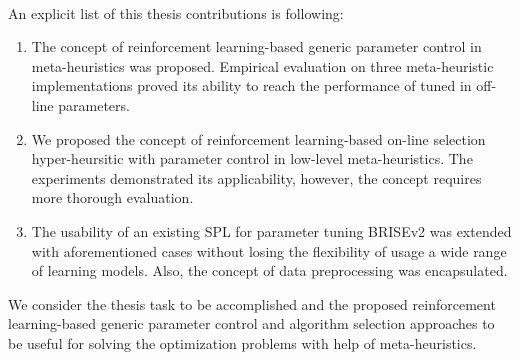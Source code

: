 \paragraph{}
An explicit list of this thesis contributions is following:
\begin{enumerate}
	\item The concept of reinforcement learning-based generic parameter control in meta-heuristics was proposed. Empirical evaluation on three meta-heuristic implementations proved its ability to reach the performance of tuned in off-line parameters.

	\item We proposed the concept of reinforcement learning-based on-line selection hyper-heursitic with parameter control in low-level meta-heuristics. The experiments demonstrated its applicability, however, the concept requires more thorough evaluation.

	\item The usability of an existing SPL for parameter tuning BRISEv2 was extended with aforementioned cases without losing the flexibility of usage a wide range of learning models. Also, the concept of data preprocessing was encapsulated.
\end{enumerate}

We consider the thesis task to be accomplished and the proposed reinforcement learning-based generic parameter control and algorithm selection approaches to be useful for solving the optimization problems with help of meta-heuristics.